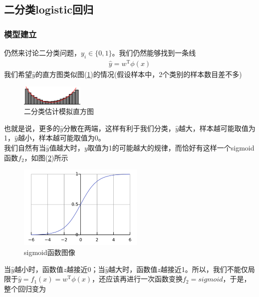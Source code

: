     \subsection{二分类logistic回归}
        \subsubsection{模型建立}
            \par
            仍然来讨论二分类问题，$y_i\in \{0,1\}$。我们仍然能够找到一条线
            \begin{align*}
            \hat{y} = w^\mathrm{T}\phi(x)
            \end{align*}
            我们希望$\hat{y}$的直方图类似图(\ref{fig:二分类估计模拟直方图})的情况(假设样本中，2个类别的样本数目差不多)
            \begin{figure}[H]
            \centering
            \includegraphics[width=3cm]{images/quadratic_estimation_simulation_histogram.jpg}
            \caption{二分类估计模拟直方图}
            \label{fig:二分类估计模拟直方图}
            \end{figure}
            也就是说，更多的$\hat{y}$分散在两端，这样有利于我们分类，$\hat{y}$越大，样本越可能取值为1，$\hat{y}$越小，样本越可能取值为0。\\
            我们自然有当$\hat{y}$值越大时，$y$取值为1的可能越大的规律，而恰好有这样一个sigmoid函数$f_2$，如图(\ref{fig:sigmoid函数图像})所示
           \begin{figure}[H]
           \centering
           \includegraphics[width=6cm]{images/sigmoid_func.png}
           \caption{sigmoid函数图像}
           \label{fig:sigmoid函数图像}
           \end{figure}
            当$\hat{y}$越小时，函数值$z$越接近0；当$\hat{y}$越大时，函数值$z$越接近1。所以，我们不能仅局限于$\hat{y} = f_1(x) = w^\mathrm{T}\phi(x)$，还应该再进行一次函数变换$f_2 = sigmoid$，于是，整个回归变为
